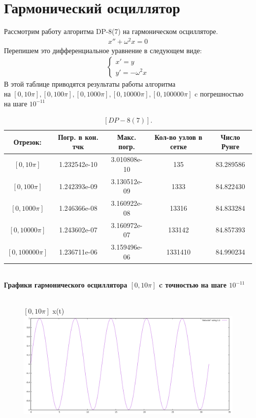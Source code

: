 \documentclass[12pt, a4paper] {report}
\theoremstyle{remark}
\theoremstyle{definition}
\begin{document}
\section{Гармонический осциллятор}
Рассмотрим работу алгоритма DP-8(7) на гармоническом осцилляторе.\\
\begin{gather}
	x'' + \omega^2x = 0
\end{gather}
Перепишем это дифференциальное уравнение в следующем виде:
\begin{gather}
\begin{cases}
	x' = y\\
	y' = -\omega^2x
\end{cases}
\end{gather}
В этой таблице приводятся результаты работы алгоритма \\на $[0, 10\pi], [0, 100\pi], [0, 1000\pi], [0, 10000\pi], [0, 100000\pi]$ c погрешностью на шаге $10^{-11}$
\\
\begin{table}
\caption{\label{tab:canonsummary}$[DP-8(7)]$.}
\begin{center}
\begin{tabular}{|c|c|c|c|c|}
\hline
Отрезок: & Погр. в кон. тчк & Макс. погр. & Кол-во узлов в сетке & Число Рунге \\
\hline
$[0, 10\pi]$ & 1.232542e-10  & 3.010808e-10 & 135 & 83.289586 \\
\hline
$[0, 100\pi]$ & 1.242393e-09 & 3.130512e-09 &  1333 & 84.822430\\
\hline
$[0, 1000\pi]$ & 1.246366e-08 & 3.160922e-08 & 13316 & 84.833284\\
\hline
$[0, 10000\pi]$ & 1.243602e-07 & 3.160972e-07 & 133142 & 84.857393\\
\hline
$[0, 100000\pi]$ & 1.236711e-06 & 3.159496e-06 & 1331410 & 84.990234\\
\hline
\end{tabular}
\end{center}
\end{table} 
\\
\textbf{Графики гармонического осциллятора $[0, 10\pi]$ c точностью на шаге $10^{-11}$}\\
\\
\begin{figure}[h!]
$[0, 10\pi]$ x(t) \\
\centering
\includegraphics[width=1\linewidth]{010pi.png} 
\end{figure}
\end{document}
